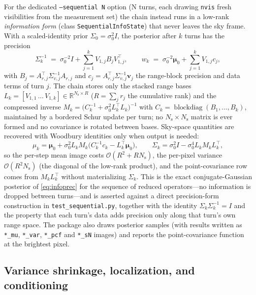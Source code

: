 \documentclass[11pt,a4paper]{article}
\newcommand{\R}{\mathbb{R}}
\newcommand{\Ns}{N_{\mathrm{s}}}
\newcommand{\vvec}{\boldsymbol{v}}
\begin{document}
For the dedicated \texttt{--sequential N} option (N turns, each drawing
\texttt{nvis} fresh visibilities from the measurement set) the chain instead
runs in a low-rank \emph{information form} (class
\texttt{SequentialInfoState}) that never leaves the sky frame.
With a scaled-identity prior $\Sigma_0=\sigma_0^2 I$, the posterior after $k$
turns has the precision
\begin{equation}
  \label{eq:infoprec}
  \Sigma_k^{-1}
  \;=\; \sigma_0^{-2}I + \sum_{j=1}^{k} V_{1,j} B_j V_{1,j}^{\!\top},
  \qquad
  w_k
  \;=\; \sigma_0^{-2}\boldsymbol{\mu}_0 + \sum_{j=1}^{k} V_{1,j} c_j,
\end{equation}
with $B_j=A_{r,j}^{\!\top}\Sigma_{v,j}^{-1}A_{r,j}$ and
$c_j=A_{r,j}^{\!\top}\Sigma_{v,j}^{-1}\vvec_j$ the range-block precision and
data terms of turn $j$. The chain stores only the stacked range bases
$L_k=[V_{1,1}\,\dots\,V_{1,k}]\in\R^{\Ns\times R}$ ($R=\sum_j r_j$ the
cumulative rank) and the compressed inverse
$M_k=\big(C_k^{-1}+\sigma_0^2 L_k^{\!\top}L_k\big)^{-1}$ with
$C_k=\operatorname{blockdiag}(B_1,\dots,B_k)$, maintained by a bordered Schur
update per turn; no $\Ns\times\Ns$ matrix is ever formed and no covariance is
rotated between bases. Sky-space quantities are recovered with Woodbury
identities only when output is needed:
\begin{equation}
  \label{eq:woodbury}
  \mu_k=\boldsymbol{\mu}_0+\sigma_0^2 L_k M_k
    \big(C_k^{-1}c_k-L_k^{\!\top}\boldsymbol{\mu}_0\big),
  \qquad
  \Sigma_k=\sigma_0^2 I-\sigma_0^4 L_k M_k L_k^{\!\top},
\end{equation}
so the per-step mean image costs $\mathcal{O}(R^2+R\Ns)$, the per-pixel
variance $\mathcal{O}(R^2\Ns)$ (the diagonal of the low-rank product), and the
point-covariance row comes from $M_kL_k^{\!\top}$ without materializing
$\Sigma_k$. This is the exact conjugate-Gaussian posterior of
\eqref{eq:infoprec} for the sequence of reduced operators---no information is
dropped between turns---and is asserted against a direct precision-form
construction in \texttt{test\_sequential.py}, together with the identity
$\Sigma_k\Sigma_k^{-1}=I$ and the property that each turn's data adds
precision only along that turn's own range space. The package also draws
posterior samples (with results written as \texttt{*\_mu}, \texttt{*\_var},
\texttt{*\_pcf} and \texttt{*\_sN} images) and reports the point-covariance
function at the brightest pixel.

\subsection{Variance shrinkage, localization, and conditioning}
\label{sec:variance}
\end{document}
